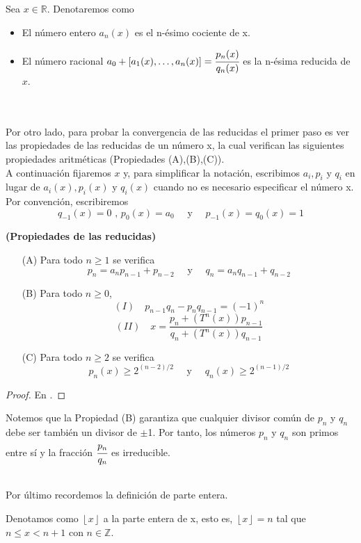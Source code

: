 \begin{defi}
Sea $x\in\mathbb{R}$. Denotaremos como
\begin{itemize}
    \item El número entero $a_{n}(x)$ es el n-ésimo cociente de x.
    \item El número racional $a_{0} + [a_{1}(x), \ldots, a_{n}(x)]=\cfrac{p_{n}(x)}{q_{n}(x)}$ es la n-ésima reducida de $x$.
\end{itemize}
\end{defi}
\\
\\
Por otro lado, para probar la convergencia de las reducidas el primer paso es ver las propiedades de las reducidas de un número x, la cual verifican las siguientes propiedades aritméticas (Propiedades (A),(B),(C)).
\\

A continuación fijaremos $x$ y, para simplificar la notación, escribimos $a_{i}, p_{i} \text{ y } q_{i}$ en lugar de $a_{i}(x), p_{i}(x) \text{ y } q_{i}(x)$ cuando no es necesario especificar el número x.
\\

Por convención, escribiremos
$$
q_{-1}(x)=0\text{ , } p_{0}(x)=a_{0} \quad\text{ y }\quad p_{-1}(x)=q_{0}(x)=1
$$
\begin{prop}
\textbf{(Propiedades de las reducidas)}
\begin{itemize}
    \item[(A)] Para todo $n\geq1$ se verifica
    $$
    p_{n}=a_{n}p_{n-1}+p_{n-2} \quad \text{ y }\quad q_{n}=a_{n}q_{n-1}+q_{n-2}
    $$
    \item[(B)] Para todo $n\geq0$,
    $$(I)\quad p_{n-1}q_{n} - p_{n}q_{n-1}=(-1)^{n}$$
    $$
    (II)\quad x=\frac{p_{n} + (T^{n}(x))p_{n-1}}{q_{n}+(T^{n}(x))q_{n-1}}
    $$
    \item[(C)] Para todo $n\geq2$ se verifica 
    $$
    p_{n}(x)\geq2^{(n-2)/2} \quad\text{ y }\quad q_{n}(x)\geq2^{(n-1)/2}
    $$
\end{itemize}
\label{ProRed}
\end{prop}
\begin{proof}
En \cite{Portugues}.
\end{proof}

\begin{obs}
Notemos que la Propiedad (B) garantiza que cualquier divisor común de $p_{n}$ y $q_{n}$ debe ser también un divisor de $\pm$1. Por tanto, los números $p_{n}$ y $q_{n}$ son primos entre sí y la fracción $\cfrac{p_{n}}{q_{n}}$ es irreducible.
\end{obs}
\\
Por último recordemos la definición de parte entera.

\begin{defi}
Denotamos como $\left\lfloor x\right\rfloor$ a la parte entera de x, esto es, $\left\lfloor x\right\rfloor=n$ tal que $n \leq x< n+1$ con $n\in\mathbb{Z}.$
\end{defi}
